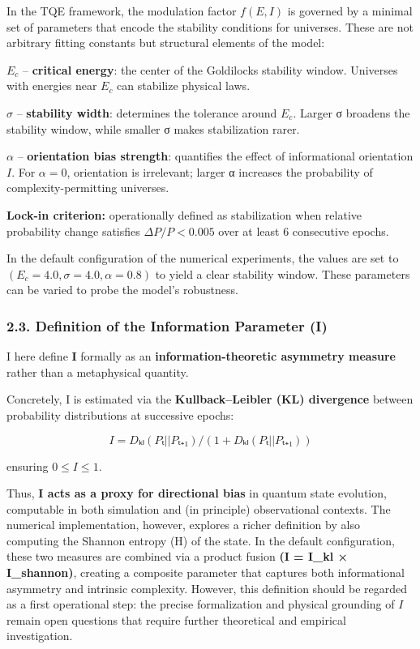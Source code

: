In the TQE framework, the modulation factor \(f(E, I)\) is governed by a
minimal set of parameters that encode the stability conditions for
universes. These are not arbitrary fitting constants but structural
elements of the model:

\(E_c\) -- \textbf{critical energy}: the center of the Goldilocks
stability window. Universes with energies near \(E_c\) can stabilize
physical laws.

\(σ\) -- \textbf{stability width}: determines the tolerance around
\(E_c\). Larger σ broadens the stability window, while smaller σ makes
stabilization rarer.

\(α\) -- \textbf{orientation bias strength}: quantifies the effect of
informational orientation \(I\). For \(α = 0\), orientation is
irrelevant; larger α increases the probability of complexity-permitting
universes.

\textbf{Lock-in criterion:} operationally defined as stabilization when
relative probability change satisfies \(ΔP / P < 0.005\) over at least 6
consecutive epochs.

In the default configuration of the numerical experiments, the values
are set to \((E_c = 4.0, σ = 4.0, α = 0.8)\) to yield a clear stability
window. These parameters can be varied to probe the model's robustness.

\subsubsection{\texorpdfstring{\textbf{2.3. Definition of the
Information Parameter
(I)}}{2.3. Definition of the Information Parameter (I)}}\label{definition-of-the-information-parameter-i}

I here define \textbf{I} formally as an \textbf{information-theoretic
asymmetry measure} rather than a metaphysical quantity.

Concretely, I is estimated via the \textbf{Kullback--Leibler (KL)
divergence} between probability distributions at successive epochs:

\[
I = Dₖₗ(Pₜ || Pₜ₊₁) / (1 + Dₖₗ(Pₜ || Pₜ₊₁))
\]

ensuring \(0 ≤ I ≤ 1\).

Thus, \textbf{I acts as a proxy for directional bias} in quantum state
evolution, computable in both simulation and (in principle)
observational contexts. The numerical implementation, however, explores
a richer definition by also computing the Shannon entropy (H) of the
state. In the default configuration, these two measures are combined via
a product fusion \textbf{(I = I\_kl × I\_shannon)}, creating a composite
parameter that captures both informational asymmetry and intrinsic
complexity. However, this definition should be regarded as a first
operational step: the precise formalization and physical grounding of
\(I\) remain open questions that require further theoretical and
empirical investigation.

